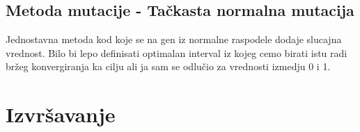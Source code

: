 \documentclass[a4paper,11pt]{book}
\begin{document}
\section{Metoda mutacije - Tačkasta normalna mutacija}

Jednostavna metoda kod koje se na gen iz normalne raspodele dodaje slucajna vrednost. Bilo bi lepo definisati optimalan interval iz kojeg cemo birati istu radi bržeg konvergiranja ka cilju ali ja sam se odlučio za vrednosti izmedju 0 i 1.

\chapter{Izvršavanje}
\end{document}
